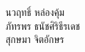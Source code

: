 \documentclass[12pt,oneside,openright,a4paper]{cpe-thai-project}
\begin{document}
\begin{flushright}
นวฤทธิ์ หล่องคุ้ม 
\\ภัทรพร 	ธนัชศิริธีรเดช
\\สุกษมา 	จิตอักษร
\end{flushright}
  
\tableofcontents                    
\listoftables
\listoffigures                      









\end{document}
